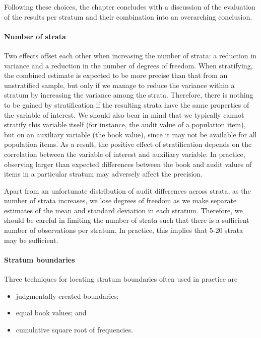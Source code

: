 \noindent
Following these choices, the chapter concludes with a discussion of the evaluation of the results per stratum and their combination into an overarching conclusion.

\paragraph{Number of strata}

Two effects offset each other when increasing the number of strata: a reduction in variance and a reduction in the number of degrees of freedom. 
When stratifying, the combined estimate is expected to be more precise than that from an unstratified sample, but only if we manage to reduce the variance within a stratum by increasing the variance among the strata. 
Therefore, there is nothing to be gained by stratification if the resulting strata have the same properties of the variable of interest. 
We should also bear in mind that we typically cannot stratify this variable itself (for instance, the audit value of a population item), but on an auxiliary variable (the book value), since it may not be available for all population items. 
As a result, the positive effect of stratification depends on the correlation between the variable of interest and auxiliary variable. 
In practice, observing larger than expected differences between the book and audit values of items in a particular stratum may adversely affect the precision.

Apart from an unfortunate distribution of audit differences across strata, as the number of strata increases, we lose degrees of freedom as we make separate estimates of the mean and standard deviation in each stratum. Therefore, we should be careful in limiting the number of strata such that there is a sufficient number of observations per stratum. In practice, this implies that 5-20 strata may be sufficient.

\paragraph{Stratum boundaries}

Three techniques for locating stratum boundaries often used in practice are
\begin{itemize}
\item judgmentally created boundaries;
\item equal book values; and
\item cumulative square root of frequencies.
\end{itemize}

